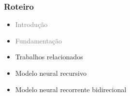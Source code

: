 \documentclass[10pt]{beamer}
\begin{document}
\begin{frame}
  \frametitle{Roteiro}


  \begin{itemize}


    
    \item[\color{gray}{$\bullet$}] \textcolor{gray}{Introdução}
    
    
    \item[\color{gray}{$\bullet$}] \textcolor{gray}{Fundamentação}


    
    \item Trabalhos relacionados

    \color{gray}
    \item[\color{gray}{$\bullet$}] Modelo neural recursivo

    \item[\color{gray}{$\bullet$}] Modelo neural recorrente bidirecional


\end{itemize}
\end{frame}
\end{document}

